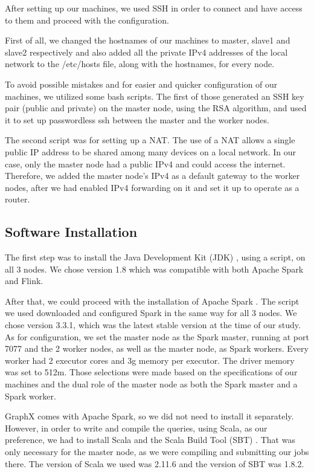 \documentclass[conference]{IEEEtran}
\begin{document}
After setting up our machines, we used SSH in order to connect and have access to them and proceed with the configuration.

First of all, we changed the hostnames of our machines to master, slave1 and slave2 respectively and also added all the private IPv4 addresses of the local network to the /etc/hosts file, along with the hostnames, for every node.

To avoid possible mistakes and for easier and quicker configuration of our machines, we utilized some bash scripts. The first of those generated an SSH key pair (public and private) on the master node, using the RSA algorithm, and used it to set up passwordless ssh between the master and the worker nodes.

The second script was for setting up a NAT. The use of a NAT allows a single public IP address to be shared among many devices on a local network. In our case, only the master node had a public IPv4 and could access the internet. Therefore, we added the master node’s IPv4 as a default gateway to the worker nodes, after we had enabled IPv4 forwarding on it and set it up to operate as a router.

\subsection{Software Installation}

The first step was to install the Java Development Kit (JDK) \cite{b8}, using a script, on all 3 nodes. We chose version 1.8 which was compatible with both Apache Spark and Flink. 

After that, we could proceed with the installation of Apache Spark \cite{b9}. The script we used downloaded and configured Spark in the same way for all 3 nodes. We chose version 3.3.1, which was the latest stable version at the time of our study. As for configuration, we set the master node as the Spark master, running at port 7077 and the 2 worker nodes, as well as the master node, as Spark workers. Every worker had 2 executor cores and 3g memory per executor. The driver memory was set to 512m. Those selections were made based on the specifications of our machines and the dual role of the master node as both the Spark master and a Spark worker.

GraphX comes with Apache Spark, so we did not need to install it separately. However, in order to write and compile the queries, using Scala, as our preference, we had to install Scala \cite{b10} and the Scala Build Tool (SBT) \cite{b11}. That was only necessary for the master node, as we were compiling and submitting our jobs there. The version of Scala we used was 2.11.6 and the version of SBT was 1.8.2.
\end{document}
